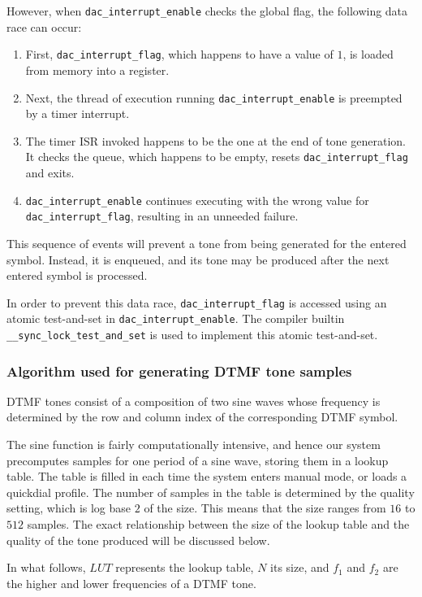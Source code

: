 \documentclass[11pt,a4paper,twocolumn]{scrartcl}
\begin{document}
However, when \verb!dac_interrupt_enable! checks the global flag, the following data race can occur:
\begin{enumerate}
   \item First, \verb!dac_interrupt_flag!, which happens to have a value of $1$, is loaded from memory into a register.
   \item Next, the thread of execution running \verb!dac_interrupt_enable! is preempted by a timer interrupt.
   \item The timer ISR invoked happens to be the one at the end of tone generation. It checks the queue, which happens to be empty, resets \verb!dac_interrupt_flag! and exits.
   \item \verb!dac_interrupt_enable! continues executing with the wrong value for \verb!dac_interrupt_flag!, resulting in an unneeded failure.
\end{enumerate}

This sequence of events will prevent a tone from being generated for the entered symbol. Instead, it is enqueued, and its tone may be produced after the next entered symbol is processed.

In order to prevent this data race, \verb!dac_interrupt_flag! is accessed using an atomic test-and-set in \verb!dac_interrupt_enable!. The compiler builtin \verb!__sync_lock_test_and_set! is used to implement this atomic test-and-set.

\subsubsection{Algorithm used for generating DTMF tone samples}

DTMF tones consist of a composition of two sine waves whose frequency is determined by the row and column index of the corresponding DTMF symbol.

The sine function is fairly computationally intensive, and hence our system precomputes samples for one period of a sine wave, storing them in a lookup table. The table is filled in each time the system enters manual mode, or loads a quickdial profile. The number of samples in the table is determined by the quality setting, which is log base $2$ of the size. This means that the size ranges from $16$ to $512$ samples. The exact relationship between the size of the lookup table and the quality of the tone produced will be discussed below.

In what follows, $LUT$ represents the lookup table, $N$ its size, and $f_1$ and $f_2$ are the higher and lower frequencies of a DTMF tone.
\end{document}
